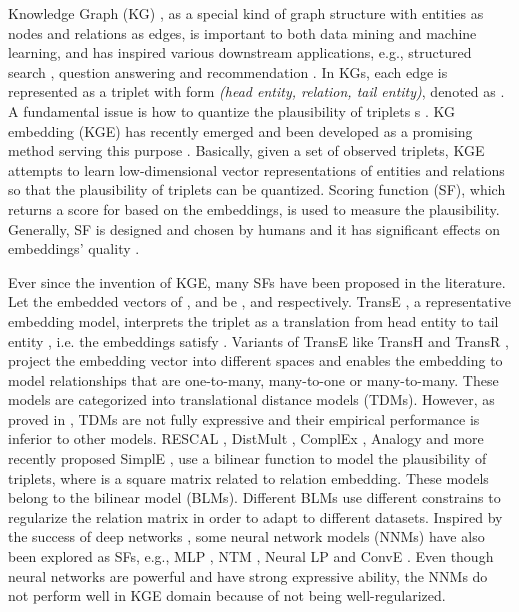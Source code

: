 \documentclass[conference]{IEEEtran}
\begin{document}
Knowledge Graph (KG) \cite{singhal2012introducing,nickel2016review,wang2017knowledge}, 
as a special kind of graph structure with entities as nodes and relations as edges, 
is important to both data mining and machine learning,
and has inspired various downstream applications, 
e.g., structured search \cite{singhal2012introducing,dong2014knowledge,tang2016aminer},
question answering \cite{lukovnikov2017neural} and
recommendation \cite{zhang2016collaborative}.
In KGs, each edge is represented as a triplet with form \textit{(head entity, relation, tail entity)},
denoted as .
A fundamental issue is how to quantize
the plausibility 
of triplets s
\cite{getoor2007introduction,wang2017knowledge}.
KG embedding (KGE) has recently emerged and been developed as 
a promising method serving this purpose
\cite{nickel2011three,yang2014embedding,nickel2016holographic,dettmers2017convolutional,trouillon2017knowledge,liu2017analogical,kazemi2018simple,lacroix2018canonical,zhang2018nscaching}. 
Basically,
given a set of observed triplets, 
KGE attempts to learn low-dimensional vector representations of entities and relations
so that the plausibility of triplets can be quantized.
Scoring function (SF),
which returns a score for  based on the embeddings,
is used to measure the plausibility.
Generally,
SF is designed and chosen by humans
and it has significant effects on embeddings' quality \cite{nickel2016review,wang2017knowledge,lin2018knowledge}.

Ever since the invention of KGE, 
many SFs have been proposed in the literature.
Let the embedded vectors of
,
 and  
be ,
 and
 respectively.
TransE \cite{bordes2013translating},
a representative embedding model,
interprets the triplet  as a translation 
from head entity  to tail entity ,
i.e.  
the embeddings satisfy .
Variants of TransE like 
TransH \cite{wang2014knowledge} and
TransR \cite{lin2015learning},
project the embedding vector into different spaces and 
enables the embedding to model relationships that are one-to-many, many-to-one or many-to-many.
These models are categorized into translational distance models (TDMs).
However, as proved in \cite{wang2017multi,wang2018evaluating},
TDMs are not fully expressive 
and their empirical performance is inferior to other models.
RESCAL \cite{nickel2011three},
DistMult \cite{yang2014embedding},
ComplEx \cite{trouillon2017knowledge},
Analogy \cite{liu2017analogical}
and more recently proposed SimplE \cite{kazemi2018simple,lacroix2018canonical},
use a bilinear function  to model the plausibility of triplets,
where  is a square matrix related to relation embedding.
These models belong to the bilinear model (BLMs).
Different BLMs use different constrains to regularize the relation matrix 
in order to adapt to different datasets.
Inspired by the success of deep networks \cite{bengio2013representation},
some neural network models (NNMs) have also been explored as SFs,
e.g., MLP \cite{dong2014knowledge}, 
NTM \cite{socher2013reasoning},
Neural LP \cite{yang2017differentiable}
and ConvE \cite{dettmers2017convolutional}.
Even though neural networks are powerful and have strong expressive ability,
the NNMs do not perform well in KGE domain because of not being well-regularized.
\end{document}
